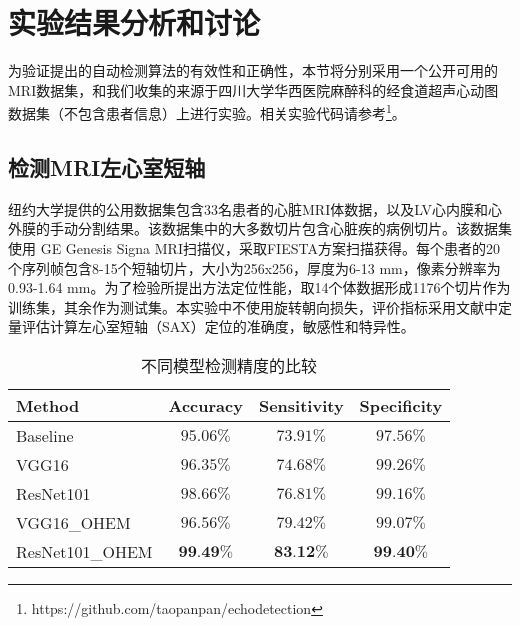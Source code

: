 \section{实验结果分析和讨论}
 
为验证提出的自动检测算法的有效性和正确性，本节将分别采用一个公开可用的MRI数据集，和我们收集的来源于四川大学华西医院麻醉科的经食道超声心动图数据集（不包含患者信息）上进行实验。相关实验代码请参考\footnote{https://github.com/taopanpan/echodetection}。

\subsection{检测MRI左心室短轴}

纽约大学提供的公用数据集\citep{Andreopoulos2008}包含33名患者的心脏MRI体数据，以及LV心内膜和心外膜的手动分割结果。该数据集中的大多数切片包含心脏疾的病例切片。该数据集使用 GE Genesis Signa MRI扫描仪，采取FIESTA方案扫描获得。每个患者的20个序列帧包含8-15个短轴切片，大小为256x256，厚度为6-13 mm，像素分辨率为0.93-1.64 mm。为了检验所提出方法定位性能，取14个体数据形成1176个切片作为训练集，其余作为测试集。本实验中不使用旋转朝向损失，评价指标采用文献中定量评估计算左心室短轴（SAX）定位的准确度，敏感性和特异性。

\begin{table}[!htbp]
    \centering
    \footnotesize%
    \setlength{\tabcolsep}{4pt}%
    \renewcommand{\arraystretch}{1.2}%
    \begin{tabular}{lccc}
        \cline{1-4}%
           \qquad Method  & Accuracy & Sensitivity &Specificity \\
        \hline
        Baseline\citep{•} & $95.06\%$ & $73.91\%$ & $97.56\%$\\
        \hline
        VGG16 & $96.35\%$ & $74.68\%$& $99.26\%$ \\
        \hline
        ResNet101 & $98.66\%$ & $76.81\%$& $99.16\%$ \\
        \hline
        VGG16\_OHEM & $96.56\%$ & $79.42\%$& $99.07\%$ \\
        \hline
        ResNet101\_OHEM & $\textbf{99.49\%}$ & $\textbf{83.12\%}$ & $\textbf{99.40\%}$\\
        \hline\hline
    \end{tabular}
    \caption{不同模型检测精度的比较}
    \label{tab:ch05_02}
\end{table}

